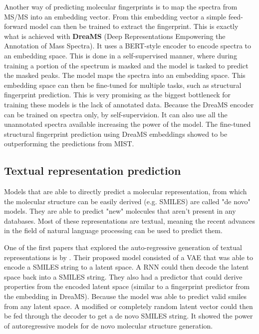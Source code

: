 Another way of predicting molecular fingerprints is to map the spectra from \ac{MS/MS} into an embedding vector. From this embedding vector a simple feed-forward model can then be trained to extract the fingerprint. This is exactly what is achieved with \textbf{DreaMS} \cite{bushuiev2024emergence} (Deep Representations Empowering the Annotation of Mass Spectra). It uses a BERT-style encoder \cite{devlin2018bert} to encode spectra to an embedding space. This is done in a self-supervised manner, where during training a portion of the spectrum is masked and the model is tasked to predict the masked peaks. The model maps the spectra into an embedding space. This embedding space can then be fine-tuned for multiple tasks, such as structural fingerprint prediction. This is very promising as the biggest bottleneck for training these models is the lack of annotated data. Because the DreaMS encoder can be trained on spectra only, by self-supervision. It can also use all the unannotated spectra available increasing the power of the model. The fine-tuned structural fingerprint prediction using DreaMS embeddings showed to be outperforming the predictions from MIST.

\subsection{Textual representation prediction}

Models that are able to directly predict a molecular representation, from which the molecular structure can be easily derived (e.g. SMILES) are called "de novo" models. They are able to predict "new" molecules that aren't present in any databases. Most of these representations are textual, meaning the recent advances in the field of natural language processing can be used to predict them.

One of the first papers that explored the auto-regressive generation of textual representations is by \textcite{gomez2018automatic}. Their proposed model consisted of a \ac{VAE} that was able to encode a SMILES string to a latent space. A \ac{RNN} could then decode the latent space back into a SMILES string. They also had a predictor that could derive properties from the encoded latent space (similar to a fingerprint predictor from the embedding in DreaMS). Because the model was able to predict valid smiles from any latent space. A modified or completely random latent vector could then be fed through the decoder to get a de novo SMILES string. It showed the power of autoregressive models for de novo molecular structure generation.

